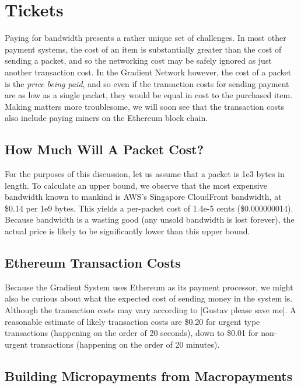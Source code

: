 \documentclass{article}
\begin{document}
\section{Tickets}

Paying for bandwidth presents a rather unique set of challenges. In most other payment systems, the cost of an item is substantially greater than the cost of sending a packet, and so the networking cost may be safely ignored as just another transaction cost. In the Gradient Network however, the cost of a packet is the \emph{price being paid}, and so even if the transaction costs for sending payment are as low as a single packet, they would be equal in cost to the purchased item. Making matters more troublesome, we will soon see that the transaction costs also include paying miners on the Ethereum block chain.

\subsection{How Much Will A Packet Cost?}

For the purposes of this discussion, let us assume that a packet is 1e3 bytes in length. To calculate an upper bound, we observe that the most expensive bandwidth known to mankind is AWS's Singapore CloudFront bandwidth, at \$0.14 per 1e9 bytes. This yields a per-packet cost of 1.4e-5 cents (\$0.000000014). Because bandwidth is a wasting good (any unsold bandwidth is lost forever), the actual price is likely to be significantly lower than this upper bound.

\subsection{Ethereum Transaction Costs}

Because the Gradient System uses Ethereum as its payment processor, we might also be curious about what the expected cost of sending money in the system is. Although the transaction costs may vary according to [Gustav please save me]. A reasonable estimate of likely transaction costs are \$0.20 for urgent type transactions (happening on the order of 20 seconds), down to \$0.01 for non-urgent transactions (happening on the order of 20 minutes).

\subsection{Building Micropayments from Macropayments}
\end{document}
